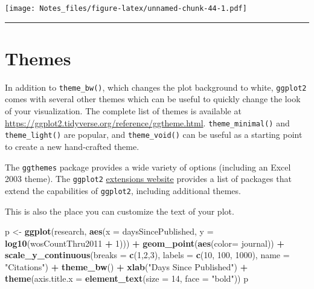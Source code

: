 \documentclass[
]{book}
\newenvironment{Shaded}{\begin{snugshade}}{\end{snugshade}}
\newcommand{\DataTypeTok}[1]{\textcolor[rgb]{0.13,0.29,0.53}{#1}}
\newcommand{\DecValTok}[1]{\textcolor[rgb]{0.00,0.00,0.81}{#1}}
\newcommand{\KeywordTok}[1]{\textcolor[rgb]{0.13,0.29,0.53}{\textbf{#1}}}
\newcommand{\NormalTok}[1]{#1}
\newcommand{\OperatorTok}[1]{\textcolor[rgb]{0.81,0.36,0.00}{\textbf{#1}}}
\newcommand{\StringTok}[1]{\textcolor[rgb]{0.31,0.60,0.02}{#1}}
\begin{document}
\texttt{[image: Notes\_files/figure-latex/unnamed-chunk-44-1.pdf]}

\begin{center}\rule{0.5\linewidth}{0.5pt}\end{center}

\hypertarget{themes}{%
\section{Themes}\label{themes}}

In addition to \texttt{theme\_bw()}, which changes the plot background to white, \texttt{ggplot2} comes with several other themes which can be useful to quickly change the look of your visualization. The complete list of themes is available at \url{https://ggplot2.tidyverse.org/reference/ggtheme.html}. \texttt{theme\_minimal()} and \texttt{theme\_light()} are popular, and \texttt{theme\_void()} can be useful as a starting point to create a new hand-crafted theme.

The \texttt{ggthemes} package provides a wide variety of options (including an Excel 2003 theme). The \texttt{ggplot2} \href{https://www.ggplot2-exts.org}{extensions website} provides a list of packages that extend the capabilities of \texttt{ggplot2}, including additional themes.

This is also the place you can customize the text of your plot.

\begin{Shaded}
\begin{Highlighting}[]
\NormalTok{p <-}\StringTok{ }\KeywordTok{ggplot}\NormalTok{(research, }\KeywordTok{aes}\NormalTok{(}\DataTypeTok{x =}\NormalTok{ daysSincePublished, }
                          \DataTypeTok{y =} \KeywordTok{log10}\NormalTok{(wosCountThru2011 }\OperatorTok{+}\StringTok{ }\DecValTok{1}\NormalTok{))) }\OperatorTok{+}\StringTok{ }
\StringTok{  }\KeywordTok{geom_point}\NormalTok{(}\KeywordTok{aes}\NormalTok{(}\DataTypeTok{color=}\NormalTok{ journal)) }\OperatorTok{+}
\StringTok{  }\KeywordTok{scale_y_continuous}\NormalTok{(}\DataTypeTok{breaks =} \KeywordTok{c}\NormalTok{(}\DecValTok{1}\NormalTok{,}\DecValTok{2}\NormalTok{,}\DecValTok{3}\NormalTok{), }\DataTypeTok{labels =} \KeywordTok{c}\NormalTok{(}\DecValTok{10}\NormalTok{, }\DecValTok{100}\NormalTok{, }\DecValTok{1000}\NormalTok{), }\DataTypeTok{name =} \StringTok{"Citations"}\NormalTok{) }\OperatorTok{+}
\StringTok{  }\KeywordTok{theme_bw}\NormalTok{() }\OperatorTok{+}
\StringTok{  }\KeywordTok{xlab}\NormalTok{(}\StringTok{"Days Since Published"}\NormalTok{) }\OperatorTok{+}
\StringTok{  }\KeywordTok{theme}\NormalTok{(}\DataTypeTok{axis.title.x =} \KeywordTok{element_text}\NormalTok{(}\DataTypeTok{size =} \DecValTok{14}\NormalTok{, }\DataTypeTok{face =} \StringTok{"bold"}\NormalTok{))}
\NormalTok{p}
\end{Highlighting}
\end{Shaded}
\end{document}
